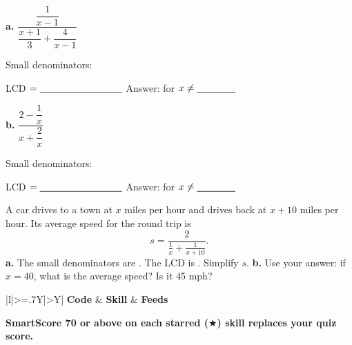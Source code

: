 \begin{minipage}[t]{0.48\textwidth}
\textbf{a.} $\dfrac{\dfrac{1}{x-1}}{\dfrac{x+1}{3}+\dfrac{4}{x-1}}$

\vspace{4pt}
Small denominators: \blank[3.4cm]

LCD $=\blank[3cm]$
\lines[5]
Answer: \blank[2.6cm] for $x\neq\blank[1.4cm]$
\end{minipage}\hfill
\begin{minipage}[t]{0.48\textwidth}
\textbf{b.} $\dfrac{2-\dfrac{1}{x}}{x+\dfrac{2}{x}}$

\vspace{4pt}
Small denominators: \blank[3.4cm]

LCD $=\blank[3cm]$
\lines[5]
Answer: \blank[2.6cm] for $x\neq\blank[1.4cm]$
\end{minipage}

\newpage

A car drives to a town at $x$ miles per hour and drives back at $x+10$ miles per hour. Its average speed for the round trip is
\[
s=\frac{2}{\frac{1}{x}+\frac{1}{x+10}}.
\]
\textbf{a.} The small denominators are \blank[3cm]. The LCD is \blank[3cm]. Simplify $s$.
\lines[3]
\textbf{b.} Use your answer: if $x=40$, what is the average speed? Is it $45$ mph? \lines[1]

\begin{tabularx}{\textwidth}{|l|>{\hsize=.7\hsize}Y|>{\hsize}Y|}
\hline
\textbf{Code} & \textbf{Skill} & \textbf{Feeds} \\ \hline
{}
\hline
\end{tabularx}

\textbf{SmartScore 70 or above on each starred ($\bigstar$) skill replaces your quiz score.}


